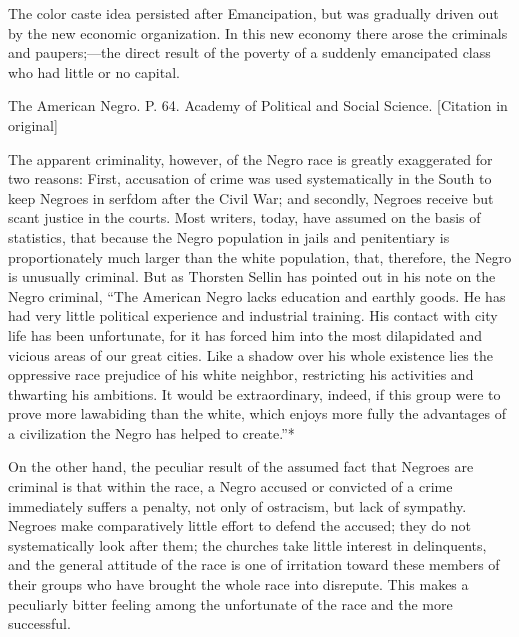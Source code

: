 \documentclass[letterpaper,10pt,english]{jupyterBook}
\begin{document}
\sphinxAtStartPar
The color caste idea persisted after Emancipation, but was gradually driven out by the new economic organization. In this new economy there arose the criminals and paupers;—the direct result of the poverty of a suddenly emancipated class who had little or no capital.

\begin{sphinxShadowBox}
\sphinxstylesidebartitle{}

\sphinxAtStartPar
The American Negro. P. 64. Academy of Political and Social Science. {[}Citation in original{]}
\end{sphinxShadowBox}

\sphinxAtStartPar
The apparent criminality, however, of the Negro race is greatly exaggerated for two reasons: First, accusation of crime was used systematically in the South to keep Negroes in serfdom after the Civil War; and secondly, Negroes receive but scant justice in the courts. Most writers, today, have assumed on the basis of statistics, that because the Negro population in jails and penitentiary is proportionately much larger than the white population, that, therefore, the Negro is unusually criminal. But as Thorsten Sellin has pointed out in his note on the Negro criminal, “The American Negro lacks education and earthly goods. He has had very little political experience and industrial training. His contact with city life has been unfortunate, for it has forced him into the most dilapidated and vicious areas of our great cities. Like a shadow over his whole existence lies the oppressive race prejudice of his white neighbor, restricting his activities and thwarting his ambitions. It would be extraordinary, indeed, if this group were to prove more law\sphinxhyphen{}abiding than the white, which enjoys more fully the advantages of a civilization the Negro has helped to create.”*

\sphinxAtStartPar
On the other hand, the peculiar result of the assumed fact that Negroes are criminal is that within the race, a Negro accused or convicted of a crime immediately suffers a penalty, not only of ostracism, but lack of sympathy. Negroes make comparatively little effort to defend the accused; they do not systematically look after them; the churches take little interest in delinquents, and the general attitude of the race is one of irritation toward these members of their groups who have brought the whole race into disrepute. This makes a peculiarly bitter feeling among the unfortunate of the race and the more successful.
\end{document}
